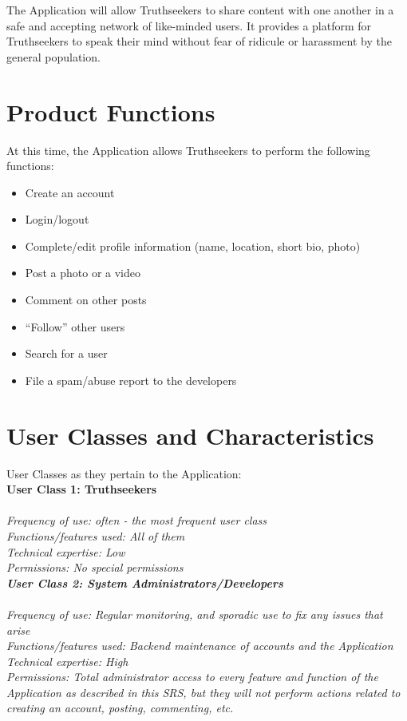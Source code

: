The Application will allow Truthseekers to share content with one another in a safe and accepting network of like-minded users. It provides a platform for Truthseekers to speak their mind without fear of ridicule or harassment by the general population.

\section{Product Functions}

At this time, the Application allows Truthseekers to perform the following functions:

\begin{itemize}
\item Create an account
\item Login/logout
\item Complete/edit profile information (name, location, short bio, photo)
\item Post a photo or a video
\item Comment on other posts
\item “Follow” other users
\item Search for a user
\item File a spam/abuse report to the developers
\end{itemize}

\section{User Classes and Characteristics}

User Classes as they pertain to the Application:\\

{\large\textbf{User Class 1: Truthseekers\\\\}}
\em{Frequency of use}\em: often - the most frequent user class\\
\em{Functions/features used}\em: All of them\\
\em{Technical expertise}\em: Low\\
\em{Permissions}\em: No special permissions\\

{\large\textbf{User Class 2: System Administrators/Developers\\\\}}
\em{Frequency of use}\em: Regular monitoring, and sporadic use to fix any issues that arise\\
\em{Functions/features used}\em: Backend maintenance of accounts and the Application\\
\em{Technical expertise}\em: High\\
\em{Permissions}\em: Total administrator access to every feature and function of the Application as described in this SRS, but they will not perform actions related to creating an account, posting, commenting, etc.

